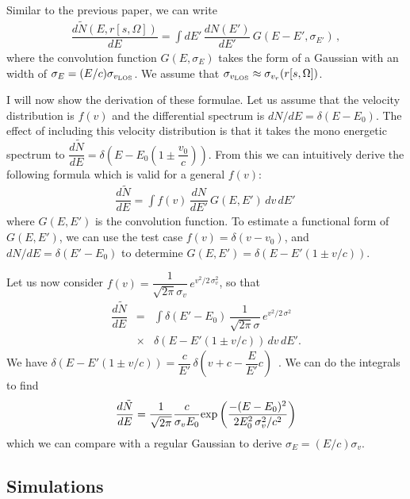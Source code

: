 \documentclass[aps,prl,10pt,twocolumn,superscriptaddress,showpacs]{revtex4-1}
\begin{document}
Similar to the previous paper, we can write
\begin{eqnarray}
\dfrac{d \tilde{N} (E, r[s, \Omega])}{dE} =\int dE' \, \dfrac{dN(E')}{dE'} \, G(E - E', \sigma_{E'}) \, ,
\label{eq:formula for modified dNdE}
\end{eqnarray}
where the convolution function $G(E, \sigma_E)$ takes the form of a Gaussian with an width of $\sigma_E = (E/c) \sigma_{v_{\rm LOS}}$.  We assume that $\sigma_{v_{\rm LOS}} \approx \sigma_{v_r}(r[s,\Omega])$.

I will now show the derivation of these formulae.  Let us assume that the velocity distribution is $f(v)$ and the differential spectrum is $dN/dE = \delta (E- E_0)$.  The effect of including this velocity distribution is that it takes the mono energetic spectrum to $\dfrac{d\tilde{N}}{dE} = \delta \left(E - E_0 (1 \pm \dfrac{v_0}{c})\right)$.  From this we can intuitively derive the following formula which is valid for a general $f(v)$:
\begin{eqnarray}
\dfrac{d\tilde{N}}{dE} = \int f(v) \, \dfrac{dN}{dE'} \, G(E, E') \, dv \, dE' \,
\label{eq:step 1}
\end{eqnarray}
where $G(E, E')$ is the convolution function.  To estimate a functional form of $G(E, E')$, we can use the test case $f(v) = \delta (v - v_0)$, and $dN/dE = \delta (E' - E_0)$ to determine $G(E, E') = \delta (E - E' (1 \pm v/c))$.

Let us now consider $f(v) = \dfrac{1}{\sqrt{2\pi} \sigma_v} \, e^{v^2/2 \, \sigma_v^2}$, so that
\begin{eqnarray}
\dfrac{d\tilde{N}}{dE} &=& \int \delta(E' - E_0) \, \dfrac{1}{\sqrt{2\pi} \sigma} \, e^{v^2/2 \, \sigma^2} \, \nonumber\\
&\times& \delta (E - E' (1 \pm v/c)) \, dv \, dE'.
\label{eq:step2}
\end{eqnarray}
We have $\delta (E - E' (1 \pm v/c)) = \dfrac{c}{E'} \, \delta \left(v + c - \dfrac{E}{E'} c \right)$\, .  We can do the integrals to find
\begin{eqnarray}
\dfrac{d\tilde{N}}{dE} =  \dfrac{1}{\sqrt{2\pi}} \dfrac{c}{\sigma_v E_0} {\rm exp} \left( \dfrac{-(E-E_0)^2}{2 E_0^2 \, \sigma_v^2/c^2} \right)
\label{eq:step3}
\end{eqnarray}
which we can compare with a regular Gaussian to derive $\sigma_E = (E/c) \sigma_v$.

\subsection{Simulations}
\label{sec:simulations}
\end{document}
